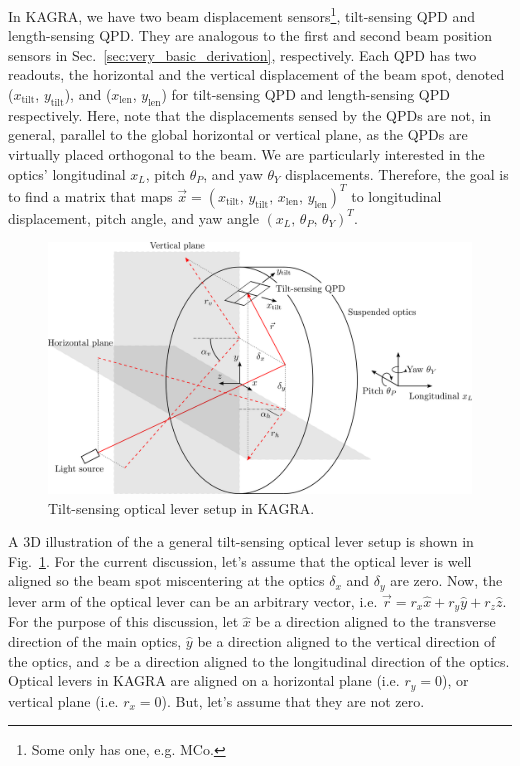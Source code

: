 In KAGRA, we have two beam displacement sensors\footnote{Some only has one, e.g. MCo.}, tilt-sensing QPD and length-sensing QPD. They are analogous to the first and second beam position sensors in Sec.~\ref{sec:very_basic_derivation}, respectively.
Each QPD has two readouts, the horizontal and the vertical displacement of the beam spot, denoted ($x_\mathrm{tilt}$, $y_\mathrm{tilt}$), and ($x_\mathrm{len}$, $y_\mathrm{len}$) for tilt-sensing QPD and length-sensing QPD respectively.
Here, note that the displacements sensed by the QPDs are not, in general, parallel to the global horizontal or vertical plane, as the QPDs are virtually placed orthogonal to the beam.
We are particularly interested in the optics' longitudinal $x_L$, pitch $\theta_P$, and yaw $\theta_Y$ displacements.
Therefore, the goal is to find a matrix that maps $\vec{x}=\left(x_\mathrm{tilt},\, y_\mathrm{tilt},\, x_\mathrm{len},\, y_\mathrm{len}\right)^T$ to longitudinal displacement, pitch angle, and yaw angle $\left(x_L,\, \theta_P,\, \theta_Y\right)^T$.

\begin{figure}[!h]
	\centering
	\includegraphics[width=0.7\linewidth]{figures/kagra_optical_lever_3d}
	\caption{Tilt-sensing optical lever setup in KAGRA.}
	\label{fig:kagraopticallever3d}
\end{figure}

A 3D illustration of the a general tilt-sensing optical lever setup is shown in Fig.~\ref{fig:kagraopticallever3d}.
For the current discussion, let's assume that the optical lever is well aligned so the beam spot miscentering at the optics $\delta_x$ and $\delta_y$ are zero.
Now, the lever arm of the optical lever can be an arbitrary vector, i.e. $\vec{r}=r_x\hat{x}+r_y\hat{y}+r_z\hat{z}$.
For the purpose of this discussion, let $\hat{x}$ be a direction aligned to the transverse direction of the main optics, $\hat{y}$ be a direction aligned to the vertical direction of the optics, and $\hat{z}$ be a direction aligned to the longitudinal direction of the optics.
Optical levers in KAGRA are aligned on a horizontal plane (i.e. $r_y=0$), or vertical plane (i.e. $r_x=0$).
But, let's assume that they are not zero.

